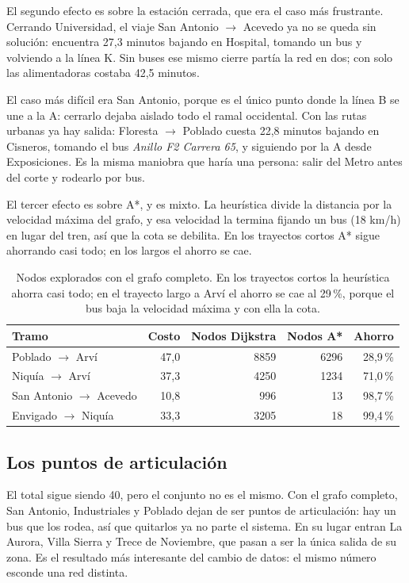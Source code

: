 \documentclass[11pt,a4paper]{article}
\begin{document}
El segundo efecto es sobre la estación cerrada, que era el caso más frustrante.
Cerrando Universidad, el viaje San Antonio $\to$ Acevedo ya no se queda sin
solución: encuentra 27,3 minutos bajando en Hospital, tomando un bus y volviendo a
la línea K. Sin buses ese mismo cierre partía la red en dos; con solo las
alimentadoras costaba 42,5 minutos.

El caso más difícil era San Antonio, porque es el único punto donde la línea B se
une a la A: cerrarlo dejaba aislado todo el ramal occidental. Con las rutas
urbanas ya hay salida: Floresta $\to$ Poblado cuesta 22,8 minutos bajando en
Cisneros, tomando el bus \emph{Anillo F2 Carrera 65}, y siguiendo por la A desde
Exposiciones. Es la misma maniobra que haría una persona: salir del Metro antes
del corte y rodearlo por bus.

El tercer efecto es sobre A*, y es mixto. La heurística divide la distancia por la
velocidad máxima del grafo, y esa velocidad la termina fijando un bus (18 km/h) en
lugar del tren, así que la cota se debilita. En los trayectos cortos A* sigue
ahorrando casi todo; en los largos el ahorro se cae.

\begin{table}[htbp]
\centering
\small
\begin{tabular}{lrrrr}
\toprule
Tramo & Costo & Nodos Dijkstra & Nodos A* & Ahorro \\
\midrule
Poblado $\to$ Arví        & 47,0 & 8859 & 6296 & 28,9\,\% \\
Niquía $\to$ Arví         & 37,3 & 4250 & 1234 & 71,0\,\% \\
San Antonio $\to$ Acevedo & 10,8 &  996 &   13 & 98,7\,\% \\
Envigado $\to$ Niquía     & 33,3 & 3205 &   18 & 99,4\,\% \\
\bottomrule
\end{tabular}
\caption{Nodos explorados con el grafo completo. En los trayectos cortos la heurística ahorra casi todo; en el trayecto largo a Arví el ahorro se cae al 29\,\%, porque el bus baja la velocidad máxima y con ella la cota.}
\label{tab:astar-bus}
\end{table}

\subsection{Los puntos de articulación}

El total sigue siendo 40, pero el conjunto no es el mismo. Con el grafo completo,
San Antonio, Industriales y Poblado dejan de ser puntos de articulación: hay un
bus que los rodea, así que quitarlos ya no parte el sistema. En su lugar entran La
Aurora, Villa Sierra y Trece de Noviembre, que pasan a ser la única salida de su
zona. Es el resultado más interesante del cambio de datos: el mismo número esconde
una red distinta.
\end{document}
